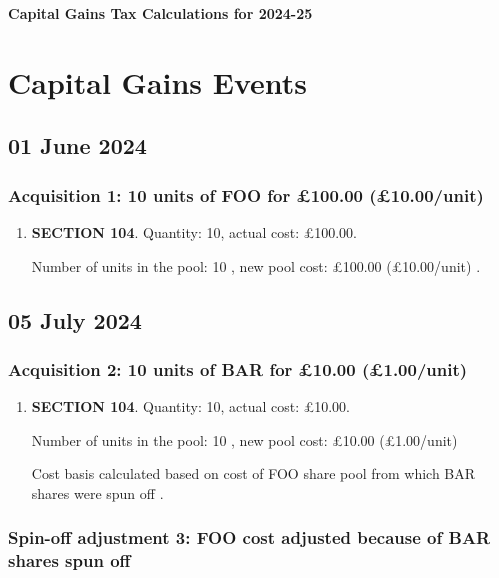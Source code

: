 \documentclass{article}
\begin{document}
\centerline{\Large\bfseries Capital Gains Tax Calculations for 2024-25}

\section*{Capital Gains Events}


\subsection*{01 June 2024}
\subsubsection*{
    Acquisition 1: 10 units of FOO for £100.00
    (£10.00/unit)%
}

\begin{enumerate}
\item \textbf{SECTION 104}. Quantity: 10,
    actual cost: £100.00.

    Number of units in the pool:
    10%
,
    new pool cost: £100.00
    (£10.00/unit)%
.

\end{enumerate}



\subsection*{05 July 2024}
\subsubsection*{
    Acquisition 2: 10 units of BAR for £10.00
    (£1.00/unit)%
}

\begin{enumerate}
\item \textbf{SECTION 104}. Quantity: 10,
    actual cost: £10.00.

    Number of units in the pool:
    10%
,
    new pool cost: £10.00
    (£1.00/unit)%

    Cost basis calculated based on cost of FOO share pool from which BAR shares were spun off%
.

\end{enumerate}

\subsubsection*{
    Spin-off adjustment 3: FOO cost adjusted because of BAR shares spun off
}
\end{document}
